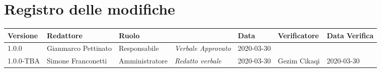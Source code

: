 \section*{Registro delle modifiche}
\renewcommand{\arraystretch}{1.8}

  \setlength\LTleft{-1.7cm}
  \begin{longtable}{|p{1.7cm}|p{2cm}|p{2.5cm}|p{3cm}|p{1.7cm}|p{2cm}|p{2.3cm}|}
    \hline

    \rowcolor{header}
    \textbf{Versione} & \textbf{Redattore} & \textbf{Ruolo} & \centering{\textbf{Descrizione}} & \textbf{Data} & \textbf{Verificatore} & \textbf{Data Verifica}\\

    \hline
    1.0.0 & Gianmarco Pettinato & Responsabile & \small{\textit{Verbale Approvato}} & 2020-03-30 & &\\
	  1.0.0-TBA & Simone Franconetti & Amministratore & \small{\textit{Redatto verbale}} & 2020-03-30 & Gezim Cikaqi & 2020-03-30 \\
    \hline
  \end{longtable}
  \setlength\LTleft{0cm}
